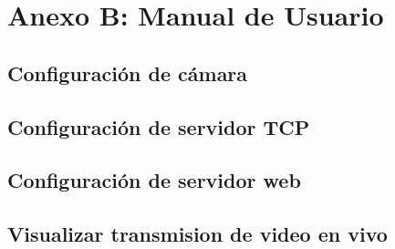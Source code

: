 \chapter{Anexo B: Manual de Usuario}


\section{Configuración de cámara}

\section{Configuración de servidor TCP}

\section{Configuración de servidor web}
\section{Visualizar transmision de video en vivo}

